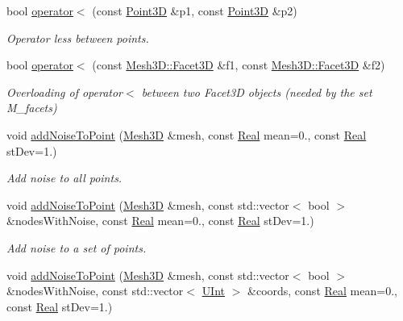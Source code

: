 \begin{DoxyCompactItemize}
\item 
bool \hyperlink{namespaceFVCode3D_a4d68dd4dc8a2720cd431013bc580e9d6}{operator$<$} (const \hyperlink{classFVCode3D_1_1Point3D}{Point3D} \&p1, const \hyperlink{classFVCode3D_1_1Point3D}{Point3D} \&p2)
\begin{DoxyCompactList}\small\item\em Operator less between points. \end{DoxyCompactList}\item 
bool \hyperlink{namespaceFVCode3D_a66dad0ddea6ea9e534d2c3f3bb5d9958}{operator$<$} (const \hyperlink{classFVCode3D_1_1Mesh3D_1_1Facet3D}{Mesh3\+D\+::\+Facet3D} \&f1, const \hyperlink{classFVCode3D_1_1Mesh3D_1_1Facet3D}{Mesh3\+D\+::\+Facet3D} \&f2)
\begin{DoxyCompactList}\small\item\em Overloading of operator$<$ between two Facet3D objects (needed by the set M\+\_\+facets) \end{DoxyCompactList}\item 
void \hyperlink{namespaceFVCode3D_a9f604a7093f7f7323727e7ba28d8ce75}{add\+Noise\+To\+Point} (\hyperlink{classFVCode3D_1_1Mesh3D}{Mesh3D} \&mesh, const \hyperlink{namespaceFVCode3D_a40c1f5588a248569d80aa5f867080e83}{Real} mean=0., const \hyperlink{namespaceFVCode3D_a40c1f5588a248569d80aa5f867080e83}{Real} st\+Dev=1.)
\begin{DoxyCompactList}\small\item\em Add noise to all points. \end{DoxyCompactList}\item 
void \hyperlink{namespaceFVCode3D_a83503dfaf8e3d2594eda363a28c5425a}{add\+Noise\+To\+Point} (\hyperlink{classFVCode3D_1_1Mesh3D}{Mesh3D} \&mesh, const std\+::vector$<$ bool $>$ \&nodes\+With\+Noise, const \hyperlink{namespaceFVCode3D_a40c1f5588a248569d80aa5f867080e83}{Real} mean=0., const \hyperlink{namespaceFVCode3D_a40c1f5588a248569d80aa5f867080e83}{Real} st\+Dev=1.)
\begin{DoxyCompactList}\small\item\em Add noise to a set of points. \end{DoxyCompactList}\item 
void \hyperlink{namespaceFVCode3D_a2e19a6aeb189d2ca5370234dd84caa73}{add\+Noise\+To\+Point} (\hyperlink{classFVCode3D_1_1Mesh3D}{Mesh3D} \&mesh, const std\+::vector$<$ bool $>$ \&nodes\+With\+Noise, const std\+::vector$<$ \hyperlink{namespaceFVCode3D_a4bf7e328c75d0fd504050d040ebe9eda}{U\+Int} $>$ \&coords, const \hyperlink{namespaceFVCode3D_a40c1f5588a248569d80aa5f867080e83}{Real} mean=0., const \hyperlink{namespaceFVCode3D_a40c1f5588a248569d80aa5f867080e83}{Real} st\+Dev=1.)

\end{DoxyCompactItemize}
